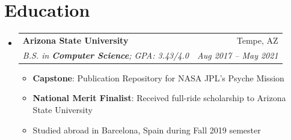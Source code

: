 \documentclass[letterpaper,10pt]{article}
\makeatletter
\newcommand{\resumeItem}[2]{
  \item\small{
    \textbf{#1}{: #2 \vspace{-2pt}}
  }
}
\newcommand{\resumeItemWithoutTitle}[1]{
  \item\small{
    {#1\vspace{-2pt}}
  }
}
\newcommand{\resumeSubheading}[4]{
  \vspace{-1pt}\item
    \begin{tabular*}{\linewidth}{l@{\extracolsep{\fill}}r}
      \textbf{#1} & #2 \\
      \textit{\small#3} & \textit{\small #4} \\
    \end{tabular*}\vspace{-5pt}
}
\newcommand{\resumeSubHeadingListStart}{\begin{itemize}[leftmargin=0pt, label={}]}
\newcommand{\resumeSubHeadingListEnd}{\end{itemize}}
\newcommand{\resumeItemListStart}{\begin{itemize}}
\newcommand{\resumeItemListEnd}{\end{itemize}\vspace{-5pt}}
\makeatother
\begin{document}
\section{Education}
  \resumeSubHeadingListStart
    \resumeSubheading
      {{Arizona State University}}{Tempe, AZ}
      {B.S. in \textbf{Computer Science};  GPA: 3.43/4.0}{Aug 2017 -- May 2021}
        \resumeItemListStart
        \resumeItem{Capstone}{Publication Repository for NASA JPL's Psyche Mission}
        \resumeItem{{National Merit Finalist}}{Received full-ride scholarship to Arizona State University}
        \resumeItemWithoutTitle{Studied abroad in Barcelona, Spain during Fall 2019 semester}
        \resumeItemListEnd
     
  \resumeSubHeadingListEnd
\end{document}

